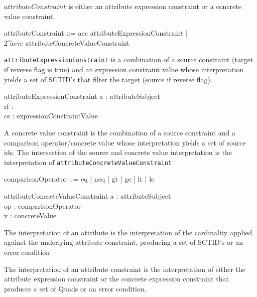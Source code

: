 \documentclass{article}
\def\spec#1{{\tt #1}}
\begin{document}
$attributeConstraint$ is either an attribute expression constraint or a concrete value constraint.
\begin{zed}
attributeConstraint ::= aec \ldata attributeExpressionConstraint \rdata | \\
\t2 acvc \ldata attributeConcreteValueConstraint \rdata \\
\end{zed}

\spec{attributeExpressionEonstraint} is a combination of a source constraint (target if reverse flag is true) and an
expression constraint value whose interpretation yields a set of SCTID's that filter the target (source if reverse flag).
\begin{zed}
[reverseFlag] 
\end{zed}
\begin{schema}{attributeExpressionConstraint}
   a : attributeSubject \\
   rf : \optional[reverseFlag] \\
   cs : expressionConstraintValue
\end{schema}

A concrete value constraint is the combination of a source constraint and a comparison operator/concrete value 
whose interpretation yields a set of source ids.  The intersection of the source and concrete value interpretation
is the interpretation of \spec{attributeConcreteValueConstraint}
\begin{zed}
comparisonOperator ::= eq | neq | gt | ge | lt | le 
\end{zed}
\begin{schema}{attributeConcreteValueConstraint}
   a : attributeSubject \\
   op : comparisonOperator \\
   v : concreteValue
\end{schema}

The interpretation of an attribute is the interpretation of the cardinality applied against the
underlying attribute constraint, producing a set of SCTID's or an error condition

The interpretation of an attribute constraint is the interpretation of either the attribute expression
constraint or the concrete expression constraint that produces a set of Quads or an error condition.
\end{document}

